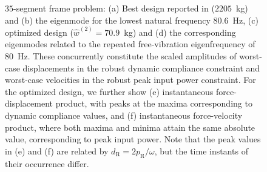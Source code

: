 \documentclass[preprint,3p]{elsarticle}
\newcommand{\TC}{^{\mathsf H}}
\newcommand{\R}{\mathrm{R}}
\numberwithin{equation}{section}
\begin{document}
\begin{figure}[!t]
\begin{subfigure}{0.45\linewidth}
\caption{}
\label{fig:frame35_compliance}
\end{subfigure}%
\hfill\begin{subfigure}{0.45\linewidth}
\caption{}
\label{fig:frame35_power}
\end{subfigure}
\caption{$35$-segment frame problem: (a) Best design reported in \citep{Ni2014} ($2205$~kg) and (b) the eigenmode for the lowest natural frequency $80.6$~Hz, (c) optimized design ($\hat{w}^{(2)}=70.9$~kg) and (d) the corresponding eigenmodes related to the repeated free-vibration eigenfrequency of $80$~Hz. These concurrently constitute the scaled amplitudes of worst-case displacements in the robust dynamic compliance constraint and worst-case velocities in the robust peak input power constraint. For the optimized design, we further show (e) instantaneous force-displacement product, with peaks at the maxima corresponding to dynamic compliance values, and (f) instantaneous force-velocity product, where both maxima and minima attain the same absolute value, corresponding to peak input power. Note that the peak values in (e) and (f) are related by $d_\R = 2p_\R/\omega$, but the time instants of their occurrence differ.}
\label{fig:frame35design}
\end{figure}
\end{document}
